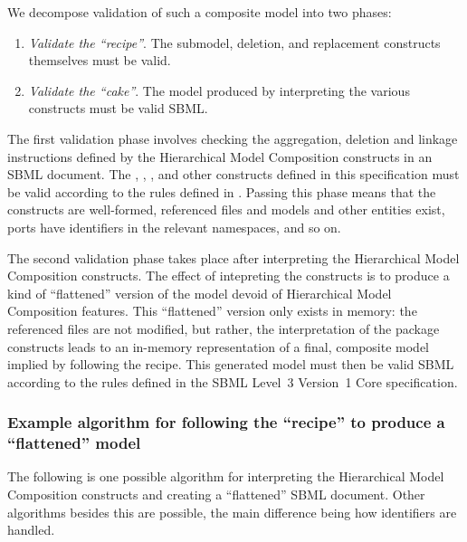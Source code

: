 We decompose validation of such a composite model into two phases:

\begin{enumerate}\setlength{\parskip}{0ex}

\item \emph{Validate the ``recipe''}.  The submodel, deletion, and
  replacement constructs themselves must be valid.

\item \emph{Validate the ``cake''}.  The model produced by interpreting
  the various constructs must be valid SBML.

\end{enumerate}

The first validation phase involves checking the aggregation, deletion
and linkage instructions defined by the Hierarchical Model Composition
constructs in an SBML document.  The \Submodel, \Port, \Deletion,
\ReplacedElement and other constructs defined in this specification must
be valid according to the rules defined in .
Passing this phase means that the constructs are well-formed, referenced
files and models and other entities exist, ports have identifiers in the
relevant namespaces, and so on.

The second validation phase takes place after interpreting the
Hierarchical Model Composition constructs.  The effect of intepreting
the constructs is to produce a kind of ``flattened'' version of the
model devoid of Hierarchical Model Composition features.  This
``flattened'' version only exists in memory: the referenced files are
not modified, but rather, the interpretation of the package constructs
leads to an in-memory representation of a final, composite model implied
by following the recipe.  This generated model must then be valid SBML
according to the rules defined in the SBML Level~3 Version~1 Core
specification.


\subsubsection{Example algorithm for following the ``recipe'' to produce
  a ``flattened'' model}

The following is one possible algorithm for interpreting the
Hierarchical Model Composition constructs and creating a ``flattened''
SBML document.  Other algorithms besides this are possible, the main
difference being how identifiers are handled.


